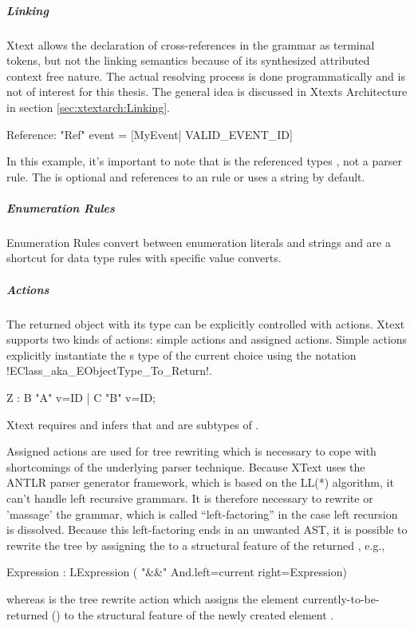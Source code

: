 \subparagraph{Linking}
Xtext allows the declaration of cross-references in the grammar as terminal tokens, but not the linking semantics because of its synthesized attributed context free nature. The actual resolving process is done programmatically and is not of interest for this thesis. The general idea is discussed in Xtexts Architecture in section \ref{sec:xtextarch:Linking}. 
\begin{xtxt}
Reference:  "Ref" event = [MyEvent| VALID_EVENT_ID]
\end{xtxt}
In this example, it's important to note that  is the referenced types , not a parser rule. The  is optional and references to an  rule or uses a string by default.

\subparagraph{Enumeration Rules}
Enumeration Rules convert between enumeration literals and strings and are a shortcut for data type rules with specific value converts.

\subparagraph{Actions}
The returned object with its type can be explicitly controlled with actions. Xtext supports two kinds of actions: simple actions and assigned actions. Simple actions explicitly instantiate the s type of the current choice using the notation \kode!{EClass_aka_EObjectType_To_Return}!.
\begin{xtxt}
Z 	: 	{B} "A" v=ID
	| 	{C} "B" v=ID;
\end{xtxt}
Xtext requires and infers that  and  are subtypes of . 

Assigned actions are used for tree rewriting which is necessary to cope with shortcomings of the underlying parser technique. Because XText uses the ANTLR parser generator framework, which is based on the LL(*) algorithm, it can't handle left recursive grammars. It is therefore necessary to rewrite or 'massage' the grammar, which is called ``left-factoring'' in the case left recursion is dissolved. Because this left-factoring ends in an unwanted AST, it is possible to rewrite the tree by assigning the  to a structural feature of the returned , e.g., 
\begin{xtxt}
Expression 	: 	LExpression 
	 	( "&&" {And.left=current}  right=Expression)
\end{xtxt}
whereas  is the tree rewrite action which assigns the element currently-to-be-returned () to the structural feature  of the newly created element .



